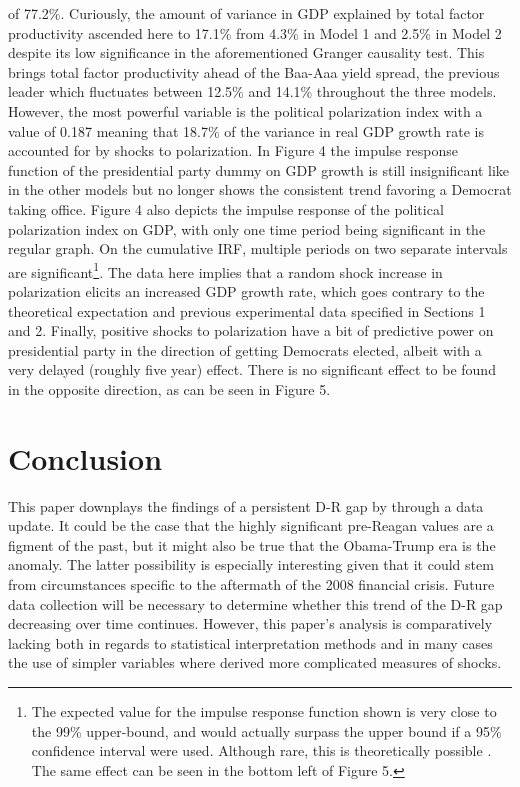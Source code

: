 \documentclass[a4paper, 12pt]{article}
\begin{document}
\noindent of 77.2\%. Curiously, the amount of variance in GDP explained by total factor productivity ascended here to 17.1\% from 4.3\% in Model 1 and 2.5\% in Model 2 despite its low significance in the aforementioned Granger causality test. This brings total factor productivity ahead of the Baa-Aaa yield spread, the previous leader which fluctuates between 12.5\% and 14.1\% throughout the three models. However, the most powerful variable is the political polarization index with a value of 0.187 meaning that 18.7\% of the variance in real GDP growth rate is accounted for by shocks to polarization. In Figure 4 the impulse response function of the presidential party dummy on GDP growth is still insignificant like in the other models but no longer shows the consistent trend favoring a Democrat taking office. Figure 4 also depicts the impulse response of the political polarization index on GDP, with only one time period being significant in the regular graph. On the cumulative IRF, multiple periods on two separate intervals are significant\footnote{The expected value for the impulse response function shown is very close to the 99\% upper-bound, and would actually surpass the upper bound if a 95\% confidence interval were used. Although rare, this is theoretically possible \cite{hoekstra2015}. The same effect can be seen in the bottom left of Figure 5.}. The data here implies that a random shock increase in polarization elicits an increased GDP growth rate, which goes contrary to the theoretical expectation and previous experimental data specified in Sections 1 and 2. Finally, positive shocks to polarization have a bit of predictive power on presidential party in the direction of getting Democrats elected, albeit with a very delayed (roughly five year) effect. There is no significant effect to be found in the opposite direction, as can be seen in Figure 5. \par 




\section{Conclusion}
This paper downplays the findings of a persistent D-R gap by  through a data update. It could be the case that the highly significant pre-Reagan values are a figment of the past, but it might also be true that the Obama-Trump era is the anomaly. The latter possibility is especially interesting given that it could stem from circumstances specific to the aftermath of the 2008 financial crisis. Future data collection will be necessary to determine whether this trend of the D-R gap decreasing over time continues. However, this paper's analysis is comparatively lacking both in regards to statistical interpretation methods and in many cases the use of simpler variables where \citeauthor{blinderwatson2016} derived more complicated measures of shocks. \par
\end{document}
